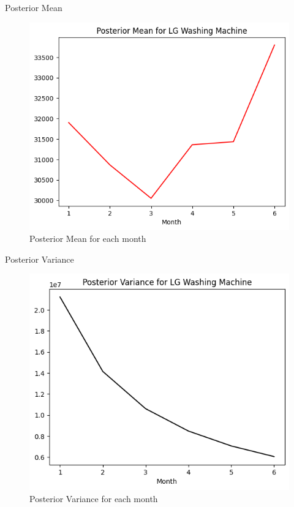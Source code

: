 \begin{frame}{Posterior Mean}
    
\begin{figure}
  \centering
  \includegraphics[width=.8\linewidth]{../Report/images/mean.png}
  \caption{Posterior Mean for each month}
\end{figure}

\end{frame}

\begin{frame}{Posterior Variance}

\begin{figure}
  \centering
  \includegraphics[width=.8\linewidth]{../Report/images/var.png}
  \caption{Posterior Variance for each month}
\end{figure}

\end{frame}